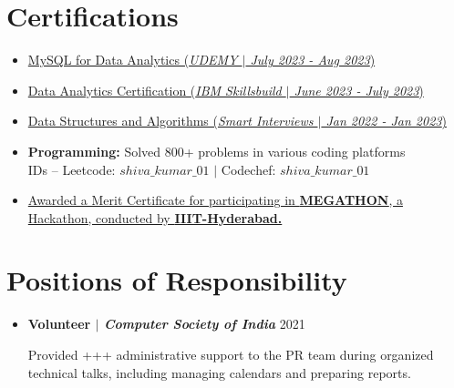 \documentclass[letterpaper,5pt]{article}
\begin{document}
    \section{Certifications}
    \begin{itemize}[leftmargin=0.15in,label={}]
      \item[\textbullet{}]\href{https://}{MySQL for Data Analytics (\emph{UDEMY $|$ July 2023 - Aug 2023})} \faExternalLink* \\
      \item[\textbullet{}]\href{https://}{Data Analytics Certification (\emph{IBM Skillsbuild $|$ June 2023 - July 2023})} \faExternalLink* \\
      \item[\textbullet{}]\href{https://}{Data Structures and Algorithms (\emph{Smart Interviews $|$ Jan 2022 - Jan 2023})} \faExternalLink* \\
      \item[\textbullet{}]\textbf{Programming:} Solved 800+ problems in various coding platforms \\
        IDs -- Leetcode: \href{https://leetcode.com/shiva_kumar_01}{{\bf$shiva\_kumar\_01$}} \faExternalLink* $|$ 
        Codechef: \href{https://www.codechef.com/users/shiva_kumar_01}{{\bf$shiva\_kumar\_01$}} \faExternalLink* \\
      \item[\textbullet{}]\href{https://drive.google.com/file/d/1e3po31SH4F8SK9jfTujhWRTyP6mIwR3i/view?usp=sharing}{Awarded a Merit Certificate for participating in {\bf MEGATHON}, a Hackathon, conducted by {\ttfamily\bfseries IIIT-Hyderabad.}} \faExternalLink*
    \end{itemize}
    
    \section{Positions of Responsibility}
    \begin{itemize}[leftmargin=0.15in, label={}]
        \item \textbf{Volunteer $|$ \emph{Computer Society of India}  }{2021}
        \begin{itemize}
            \textbullet{} Provided +++ administrative support to the PR team during organized technical talks, including managing calendars and preparing reports.
        \end{itemize}
    \end{itemize}
    
    
\end{document}
